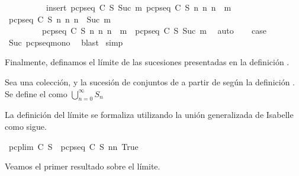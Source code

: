 \begin{isabellebody}
\ \ \ \ \ \ \ \ \ \ insert\ {\isacharparenleft}pcp{\isacharunderscore}seq\ C\ S\ {\isacharparenleft}Suc\ m{\isacharparenright}{\isacharparenright}\ {\isacharbraceleft}pcp{\isacharunderscore}seq\ C\ S\ n\ {\isacharbar}n{\isachardot}\ n\ {\isasymle}\ m{\isacharbraceright}{\isachardoublequoteclose}\ \isacommand{{\isachardot}}\isamarkupfalse%
\isanewline
\ \ \isamarkupfalse%
\ {\isachardoublequoteopen}{\isasymUnion}{\isacharbraceleft}pcp{\isacharunderscore}seq\ C\ S\ n\ {\isacharbar}n{\isachardot}\ n\ {\isasymle}\ Suc\ m{\isacharbraceright}\ {\isacharequal}\ \isanewline
\ \ \ \ \ \ \ \ \ {\isasymUnion}{\isacharbraceleft}pcp{\isacharunderscore}seq\ C\ S\ n\ {\isacharbar}n{\isachardot}\ n\ {\isasymle}\ m{\isacharbraceright}\ {\isasymunion}\ pcp{\isacharunderscore}seq\ C\ S\ {\isacharparenleft}Suc\ m{\isacharparenright}{\isachardoublequoteclose}\ \isamarkupfalse%
\ auto\isanewline
\ \ \isamarkupfalse%
\ {\isacharquery}case\ \isamarkupfalse%
\ Suc\ pcp{\isacharunderscore}seq{\isacharunderscore}mono\ \isamarkupfalse%
\ blast\isanewline
{}\isamarkupfalse%
\ simp%
\endisatagproof
{\isafoldproof}%
%
\isadelimproof
%
\endisadelimproof
%
\begin{isamarkuptext}%
Finalmente, definamos el límite de las sucesiones presentadas en la definición .

 \begin{definicion}
  Sea  una colección,  y  la sucesión de conjuntos de  a partir de  según la
  definición . Se define el  como 
  $\bigcup_{n = 0}^{\infty} S_{n}$
 \end{definicion}

  La definición del límite se formaliza utilizando la unión generalizada de Isabelle como sigue.%
\end{isamarkuptext}\isamarkuptrue%
\isamarkupfalse%
\ {\isachardoublequoteopen}pcp{\isacharunderscore}lim\ C\ S\ {\isasymequiv}\ {\isasymUnion}{\isacharbraceleft}pcp{\isacharunderscore}seq\ C\ S\ n{\isacharbar}n{\isachardot}\ True{\isacharbraceright}{\isachardoublequoteclose}%
\begin{isamarkuptext}%
Veamos el primer resultado sobre el límite.


\end{isamarkuptext}
\end{isabellebody}
